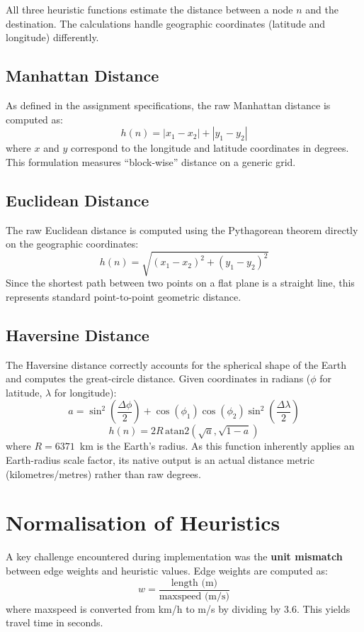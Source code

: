 \documentclass[12pt,a4paper]{article}
\begin{document}
All three heuristic functions estimate the distance between a node $n$ and the destination. The calculations handle geographic coordinates (latitude and longitude) differently.

\subsection{Manhattan Distance}
As defined in the assignment specifications, the raw Manhattan distance is computed as:
\[
  h(n) = |x_1 - x_2| + |y_1 - y_2|
\]
where $x$ and $y$ correspond to the longitude and latitude coordinates in degrees. This formulation measures ``block-wise'' distance on a generic grid.

\subsection{Euclidean Distance}
The raw Euclidean distance is computed using the Pythagorean theorem directly on the geographic coordinates:
\[
  h(n) = \sqrt{(x_1 - x_2)^2 + (y_1 - y_2)^2}
\]
Since the shortest path between two points on a flat plane is a straight line, this represents standard point-to-point geometric distance.

\subsection{Haversine Distance}
The Haversine distance correctly accounts for the spherical shape of the Earth and computes the great-circle distance. Given coordinates in radians ($\phi$ for latitude, $\lambda$ for longitude):
\[
  a = \sin^2\!\left(\frac{\Delta\phi}{2}\right) + \cos(\phi_1) \cos(\phi_2) \sin^2\!\left(\frac{\Delta\lambda}{2}\right)
\]
\[
  h(n) = 2R\,\text{atan2}(\sqrt a, \sqrt{1-a})
\]
where $R = 6371$~km is the Earth's radius. As this function inherently applies an Earth-radius scale factor, its native output is an actual distance metric (kilometres/metres) rather than raw degrees.


\section{Normalisation of Heuristics}
\label{sec:normalisation}

A key challenge encountered during implementation was the \textbf{unit mismatch} between edge weights and heuristic values. Edge weights are computed as:
\[
  w = \frac{\text{length (m)}}{\text{maxspeed (m/s)}}
\]
where maxspeed is converted from km/h to m/s by dividing by 3.6. This yields travel time in seconds.
\end{document}

